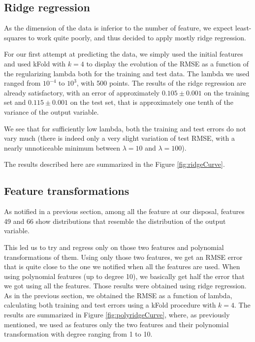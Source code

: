 \documentclass{article} %
\begin{document}
\begin{figure}[!t]
{\label{fig:xhist49}}
\hspace*{0.3in}
\caption{}
\end{figure}

\subsection{Ridge regression}
As the dimension of the data is inferior to the number of feature, we expect
least-squares to work quite poorly, and thus decided to apply mostly ridge
regression.

For our first attempt at predicting the data, we simply used the initial
features and used kFold with $k=4$ to display the evolution of the RMSE as a
function of the regularizing lambda both for the training and test data. 
The lambda we used ranged from $10^{-4}$ to
$10^3$, with 500 points. The results of the ridge regression are already
satisfactory, with an error of approximately $0.105\pm0.001$ on the training set
and $0.115\pm0.001$ on the test set, that is approximately one tenth of the
variance of the output variable.

We see that for sufficiently low lambda, both the training and test errors do
not vary much (there is indeed only a very slight variation of test RMSE, with a
nearly unnoticeable minimum between $\lambda=10$ and $\lambda=100$).

The results described here are summarized in the Figure \ref{fig:ridgeCurve}.

\subsection{Feature transformations}
As notified in a previous section, among all the feature at our disposal,
features 49 and 66 show distributions that resemble the distribution of the
output variable. 

This led us to try and regress only on those two features and polynomial
transformations of them. Using only those two features, we get an RMSE error
that is quite close to the one we notified when all the features are used. When
using polynomial features (up to degree 10), we basically get half the error
that we got using all the features. Those results were obtained using ridge
regression. As in the previous section, we obtained the RMSE as a function of
lambda, calculating both training and test errors using a kFold procedure with
$k=4$. The results are summarized in Figure \ref{fig:polyridgeCurve}, where, as
previously mentioned, we used as features only the two features and their
polynomial transformation with degree ranging from 1 to 10.
\end{document}
